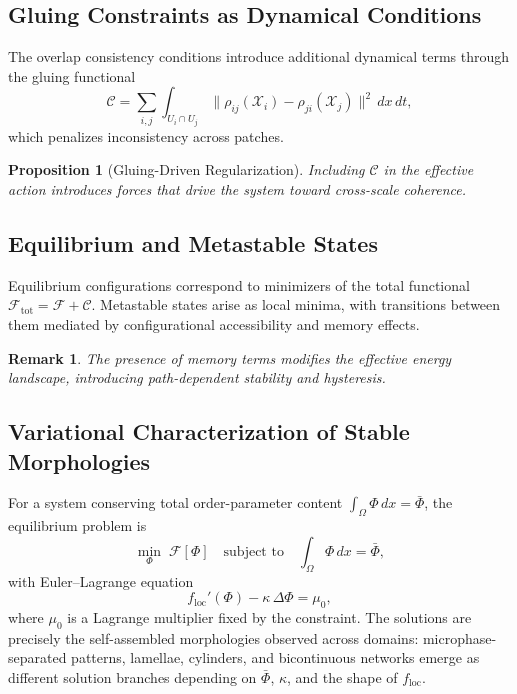 \documentclass[11pt, a4paper, twocolumn]{article}
\newtheorem{proposition}[definition]{Proposition}
\newtheorem{remark}[definition]{Remark}
\newcommand{\X}{\mathcal{X}}
\newcommand{\F}{\mathcal{F}}
\begin{document}
\subsection{Gluing Constraints as Dynamical Conditions}

The overlap consistency conditions introduce additional dynamical terms through
the gluing functional
\[
    \mathcal{C}
    =
    \sum_{i,j}
    \int_{U_i \cap U_j}
    \|\rho_{ij}(\X_i) - \rho_{ji}(\X_j)\|^2 \, dx\,dt,
\]
which penalizes inconsistency across patches.

\begin{proposition}[Gluing-Driven Regularization]
Including $\mathcal{C}$ in the effective action introduces forces that drive
the system toward cross-scale coherence.
\end{proposition}

\subsection{Equilibrium and Metastable States}

Equilibrium configurations correspond to minimizers of the total functional
$\F_{\mathrm{tot}} = \F + \mathcal{C}$. Metastable states arise as local
minima, with transitions between them mediated by configurational accessibility
and memory effects.

\begin{remark}
The presence of memory terms modifies the effective energy landscape,
introducing path-dependent stability and hysteresis.
\end{remark}

\subsection{Variational Characterization of Stable Morphologies}

For a system conserving total order-parameter content
$\int_\Omega \Phi\,dx = \bar\Phi$, the equilibrium problem is
\[
    \min_{\Phi}\;\F[\Phi]
    \quad\text{subject to}\quad
    \int_\Omega \Phi\,dx = \bar\Phi,
\]
with Euler--Lagrange equation
\[
    f_{\mathrm{loc}}'(\Phi) - \kappa\,\Delta\Phi = \mu_0,
\]
where $\mu_0$ is a Lagrange multiplier fixed by the constraint. The solutions
are precisely the self-assembled morphologies observed across domains: microphase-
separated patterns, lamellae, cylinders, and bicontinuous networks emerge as
different solution branches depending on $\bar\Phi$, $\kappa$, and the shape of
$f_{\mathrm{loc}}$.
\end{document}
